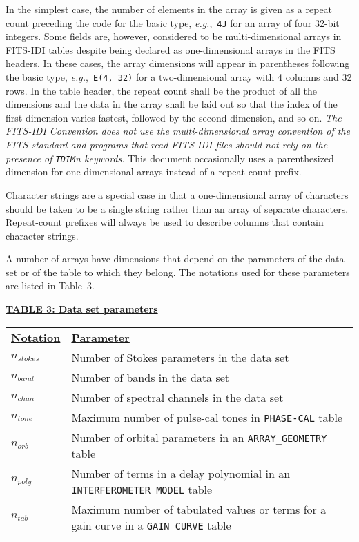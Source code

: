 \documentclass[twoside]{article}
\newcommand{\Hi}[1]{\textcolor{hicol}{#1}}
\newcommand{\Me}[1]{\textcolor{mecol}{#1}}
\newcommand{\eg}{{\it e.g.},}
\newcommand{\nstokes}{$n_{stokes}$}
\newcommand{\nband}{$n_{band}$}
\newcommand{\nchan}{$n_{chan}$}
\newcommand{\ntone}{$n_{tone}$}
\newcommand{\norb}{$n_{orb}$}
\newcommand{\npoly}{$n_{poly}$}
\newcommand{\ntab}{$n_{tab}$}
\begin{document}
In the simplest case, the number of elements in the array is given as
a repeat count preceding the code for the basic type, \eg\ {\tt 4J}
for an array of four 32-bit integers.  Some fields are, however,
considered to be multi-dimensional arrays in FITS-IDI tables despite
being declared as one-dimensional arrays in the FITS headers.  In
these cases, the array dimensions will appear in parentheses following
the basic type, \eg\ {\tt E(4, 32)} for a two-dimensional array with 4
\Hi{columns} and 32 \Hi{rows}.  In the table header, the repeat count
\Hi{shall} be the product of all the dimensions and the data in the
array \Hi{shall} be laid out so that the index of the first dimension
varies fastest, followed by the second dimension, and so on.  \Hi{\it
The FITS-IDI Convention does not use the multi-dimensional array
convention of the FITS standard and programs that read FITS-IDI files
should not rely on the presence of {\tt TDIM}{\it n} keywords.}  This
document occasionally uses a parenthesized dimension for
one-dimensional arrays instead of a repeat-count prefix.

Character strings are a special case in that a one-dimensional array
of characters should be taken to be a single string rather than an
array of separate characters.  Repeat-count prefixes will always be
used to describe columns that contain character strings.

A number of arrays have dimensions that depend on the parameters of
the data set or of the table to which they belong.  The notations used
for these parameters are listed in Table~3.

\vfill\eject
\begin{center}
\underline{\bf{TABLE 3: Data set parameters}}\\
\begin{tabular}{ll}
\noalign{\vspace{2pt}}
\underline{{\bf Notation\vphantom{y}}} &
    \underline{\bf{Parameter\vphantom{y}}} \\
\noalign{\vspace{2pt}}
 \nstokes & Number of Stokes parameters in the data set \\
 \nband   & Number of bands in the data set \\
 \nchan   & Number of spectral channels in the data set \\
 \ntone   & Maximum number of pulse-cal tones in {\tt PHASE-CAL} table \\
 \norb    & Number of orbital parameters in an {\tt \Me{ARRAY}\_GEOMETRY}
            table\\
 \npoly   & Number of terms in a delay polynomial in an {\tt
            INTERFEROMETER\_MODEL} table \\
 \ntab    & Maximum number of tabulated values or terms for a gain
            curve in a {\tt GAIN\_CURVE} table
\end{tabular}
\end{center}
\end{document}
